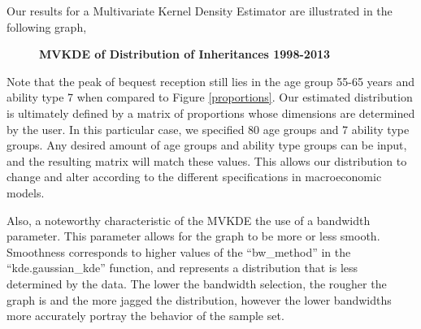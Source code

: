 \documentclass[letterpaper,12pt]{article}
\newcommand{\quotes}[1]{``#1''}
\theoremstyle{definition}
\begin{document}
\begin{spacing}{1.5}
    Our results for a Multivariate Kernel Density Estimator are illustrated in the following graph,\\

    \begin{figure}[htbp]\centering \captionsetup{width=6.0in}
    \caption{\label{MVKDE}\textbf{MVKDE of Distribution of Inheritances 1998-2013}}
  \end{figure}

\newpage
 Note that the peak of bequest reception still lies in the age group 55-65 years and ability type 7 when compared to Figure \ref{proportions}. Our estimated distribution is ultimately defined by a matrix of proportions whose dimensions are determined by the user. In this particular case, we specified 80 age groups and 7 ability type groups. Any desired amount of age groups and ability type groups can be input, and the resulting matrix will match these values. This allows our distribution to change and alter according to the different specifications in macroeconomic models.

 Also, a noteworthy characteristic of the MVKDE the use of a bandwidth parameter. This parameter allows for the graph to be more or less smooth. Smoothness corresponds to higher values of the \quotes{bw\_method} in the \quotes{kde.gaussian\_kde} function, and represents a distribution that is less determined by the data. The lower the bandwidth selection, the rougher the graph is and the more jagged the distribution, however the lower bandwidths more accurately portray the behavior of the sample set. 



\end{spacing}
\end{document}
